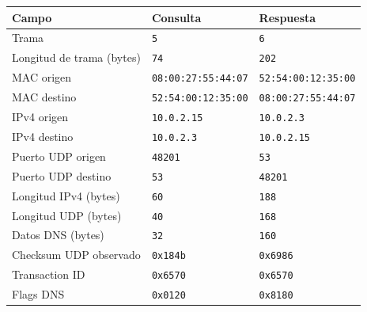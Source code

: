 \begin{tabularx}{\textwidth}{Xll}
\toprule
Campo & Consulta & Respuesta \\
\midrule
Trama & \texttt{5} & \texttt{6} \\
Longitud de trama (bytes) & \texttt{74} & \texttt{202} \\
MAC origen & \texttt{08:00:27:55:44:07} & \texttt{52:54:00:12:35:00} \\
MAC destino & \texttt{52:54:00:12:35:00} & \texttt{08:00:27:55:44:07} \\
IPv4 origen & \texttt{10.0.2.15} & \texttt{10.0.2.3} \\
IPv4 destino & \texttt{10.0.2.3} & \texttt{10.0.2.15} \\
Puerto UDP origen & \texttt{48201} & \texttt{53} \\
Puerto UDP destino & \texttt{53} & \texttt{48201} \\
Longitud IPv4 (bytes) & \texttt{60} & \texttt{188} \\
Longitud UDP (bytes) & \texttt{40} & \texttt{168} \\
Datos DNS (bytes) & \texttt{32} & \texttt{160} \\
Checksum UDP observado & \texttt{0x184b} & \texttt{0x6986} \\
Transaction ID & \texttt{0x6570} & \texttt{0x6570} \\
Flags DNS & \texttt{0x0120} & \texttt{0x8180} \\
\bottomrule
\end{tabularx}
